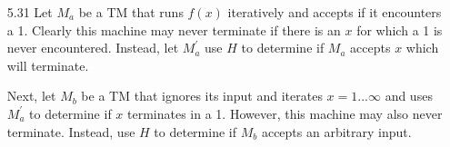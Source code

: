 \documentclass{article}
\begin{document}
\begin{itemize}
    \item[5.31] Let $M_a$ be a TM that runs $f(x)$ iteratively and accepts if it encounters a 1.  Clearly this machine
    may never terminate if there is an $x$ for which a 1 is never encountered.  Instead, let $M^{'}_a$ use $H$ to
    determine if $M_a$ accepts $x$ which will terminate.

    Next, let $M_b$ be a TM that ignores its input and iterates $x=1 ... \infty$ and uses $M^{'}_a$ to determine if $x$
    terminates in a 1.  However, this machine may also never terminate.  Instead, use $H$ to determine if $M_b$ accepts
    an arbitrary input.
\end{itemize}
\end{document}
